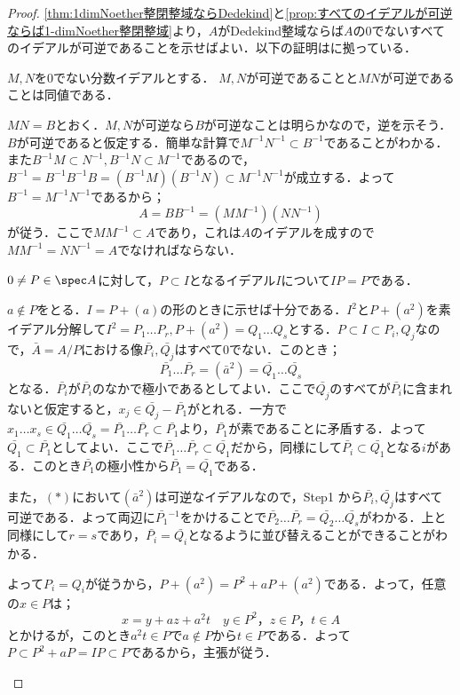 \begin{proof}
	\ref{thm:1dimNoether整閉整域ならDedekind}と\ref{prop:すべてのイデアルが可逆ならば1-dimNoether整閉整域}より，$A$がDedekind整域ならば$A$の0でないすべてのイデアルが可逆であることを示せばよい．以下の証明は\cite{matsu}に拠っている．
	
	\begin{step}
		\item $M,N$を0でない分数イデアルとする． $M,N$が可逆であることと$MN$が可逆であることは同値である．
		
		$MN=B$とおく．$M,N$が可逆なら$B$が可逆なことは明らかなので，逆を示そう．$B$が可逆であると仮定する．簡単な計算で$M^{-1}N^{-1}\subset B^{-1}$であることがわかる．また$B^{-1}M\subset N^{-1},B^{-1}N\subset M^{-1}$であるので，$B^{-1}=B^{-1}B^{-1}B=(B^{-1}M)(B^{-1}N)\subset M^{-1}N^{-1}$が成立する．よって$B^{-1}=M^{-1}N^{-1}$であるから；
		\[A=BB^{-1}=(MM^{-1})(NN^{-1})\]
		が従う．ここで$MM^{-1}\subset A$であり，これは$A$のイデアルを成すので$MM^{-1}=NN^{-1}=A$でなければならない．
	
		\item $0\neq P\in\spec A$に対して，$P\subset I$となるイデアル$I$について$IP=P$である．
		
		$a\not\in P$をとる．$I=P+(a)$の形のときに示せば十分である．$I^2$と$P+(a^2)$を素イデアル分解して$I^2=P_1\dots P_r,P+(a^2)=Q_1\dots Q_s$とする．$P\subset I\subset P_i,Q_j$なので，$\bar{A}=A/P$における像$\bar{P_i},\bar{Q_j}$はすべて0でない．このとき；
		\[\bar{P_1}\dots\bar{P_r}=(\bar{a}^2)=\bar{Q_1}\dots\bar{Q_s}\tag{$\ast$}\]
		となる．$\bar{P_i}$が$\bar{P_i}$のなかで極小であるとしてよい．ここで$\bar{Q_j}$のすべてが$\bar{P_i}$に含まれないと仮定すると，$x_j\in \bar{Q_j}-\bar{P_1}$がとれる．一方で$x_1\dots x_s\in \bar{Q_1}\dots\bar{Q_s}=\bar{P_1}\dots\bar{P_r}\subset\bar{P_1}$より，$\bar{P_1}$が素であることに矛盾する．よって$\bar{Q_1}\subset\bar{P_1}$としてよい．ここで$\bar{P_1}\dots\bar{P_r}\subset\bar{Q_1}$だから，同様にして$\bar{P_i}\subset\bar{Q_1}$となる$i$がある．このとき$\bar{P_1}$の極小性から$\bar{P_1}=\bar{Q_1}$である．
		
		また，$(\ast)$において$(\bar{a}^2)$は可逆なイデアルなので，Step1 から$\bar{P_i},\bar{Q_j}$はすべて可逆である．よって両辺に$\bar{P_1}{}^{-1}$をかけることで$\bar{P_2}\dots\bar{P_r}=\bar{Q_2}\dots\bar{Q_s}$がわかる．上と同様にして$r=s$であり，$\bar{P_i}=\bar{Q_i}$となるように並び替えることができることがわかる．
		
		よって$P_i=Q_i$が従うから，$P+(a^2)=P^2+aP+(a^2)$である．よって，任意の$x\in P$は；
		\[x=y+az+a^2t\quad y\in P^2，z\in P，t\in A\]
		とかけるが，このとき$a^2t\in P$で$a\not\in P$から$t\in P$である．よって$P\subset P^2+aP=IP\subset P$であるから，主張が従う．
		

\end{step}
\end{proof}

